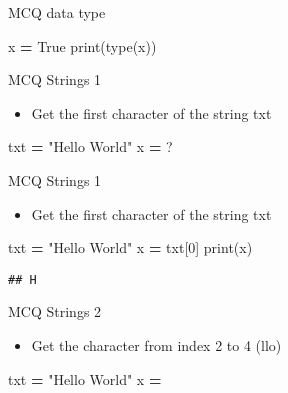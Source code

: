 \documentclass[
  8pt,
  ignorenonframetext,
]{beamer}
\newenvironment{Shaded}{\begin{snugshade}}{\end{snugshade}}
\newcommand{\BuiltInTok}[1]{#1}
\newcommand{\DecValTok}[1]{\textcolor[rgb]{0.00,0.00,0.81}{#1}}
\newcommand{\NormalTok}[1]{#1}
\newcommand{\OperatorTok}[1]{\textcolor[rgb]{0.81,0.36,0.00}{\textbf{#1}}}
\newcommand{\StringTok}[1]{\textcolor[rgb]{0.31,0.60,0.02}{#1}}
\newcommand{\VariableTok}[1]{\textcolor[rgb]{0.00,0.00,0.00}{#1}}
\providecommand{\tightlist}{%
  \setlength{\itemsep}{0pt}\setlength{\parskip}{0pt}}
\begin{document}
\begin{frame}[fragile]{MCQ data type}
\begin{Shaded}
\begin{Highlighting}[]
\NormalTok{x }\OperatorTok{=} \VariableTok{True}
\BuiltInTok{print}\NormalTok{(}\BuiltInTok{type}\NormalTok{(x))}
\end{Highlighting}
\end{Shaded}
\end{frame}

\begin{frame}[fragile]{MCQ Strings 1}
\protect\hypertarget{mcq-strings-1}{}
\begin{itemize}
\tightlist
\item
  Get the first character of the string txt
\end{itemize}

\begin{Shaded}
\begin{Highlighting}[]
\NormalTok{txt }\OperatorTok{=} \StringTok{"Hello World"}
\NormalTok{x }\OperatorTok{=}\NormalTok{ ?}
\end{Highlighting}
\end{Shaded}
\end{frame}

\begin{frame}[fragile]{MCQ Strings 1}
\protect\hypertarget{mcq-strings-1-1}{}
\begin{itemize}
\tightlist
\item
  Get the first character of the string txt
\end{itemize}

\begin{Shaded}
\begin{Highlighting}[]
\NormalTok{txt }\OperatorTok{=} \StringTok{"Hello World"}
\NormalTok{x }\OperatorTok{=}\NormalTok{ txt[}\DecValTok{0}\NormalTok{]}
\BuiltInTok{print}\NormalTok{(x)}
\end{Highlighting}
\end{Shaded}

\begin{verbatim}
## H
\end{verbatim}
\end{frame}

\begin{frame}[fragile]{MCQ Strings 2}
\protect\hypertarget{mcq-strings-2}{}
\begin{itemize}
\tightlist
\item
  Get the character from index 2 to 4 (llo)
\end{itemize}

\begin{Shaded}
\begin{Highlighting}[]
\NormalTok{txt }\OperatorTok{=} \StringTok{"Hello World"}
\NormalTok{x }\OperatorTok{=} 
\end{Highlighting}
\end{Shaded}
\end{frame}
\end{document}
